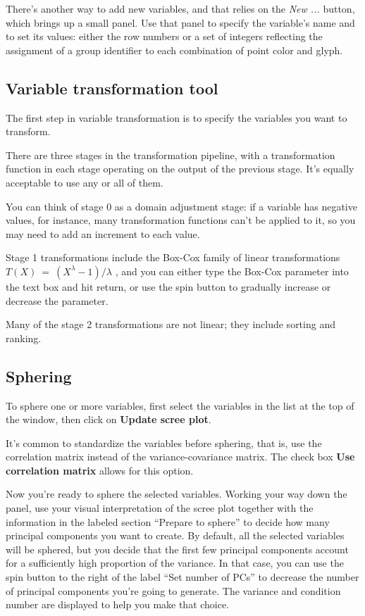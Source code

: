 \documentclass[11pt]{article}
\begin{document}
\label{NewVariable}
There's another way to add new variables, and that relies on the {\em New
...} button, which brings up a small panel.  Use that panel to specify
the variable's name and to set its values:  either the row numbers or
a set of integers reflecting the assignment of a group identifier to each
combination of point color and glyph.

\subsection{Variable transformation tool}
\label{slbl:VarTransform}

The first step in variable transformation is to specify the variables
you want to transform.

There are three stages in the transformation pipeline, with a
transformation function in each stage operating on the output of the
previous stage.  It's equally acceptable to use any or all of them.

You can think of stage 0 as a domain adjustment stage:  if a variable
has negative values, for instance, many transformation functions
can't be applied to it, so you may need to add an increment to each
value.

Stage 1 transformations include the Box-Cox family of linear
transformations \( T(X)~=~(X ^ \lambda - 1) / \lambda\) \cite{BoxCox64},
and you can either type the Box-Cox parameter into
the text box and hit return, or use the spin button to gradually
increase or decrease the parameter. 

Many of the stage 2
transformations are not linear; they include sorting and ranking.

\subsection{Sphering}
\label{slbl:Sphering}

To sphere one or more variables, first select the variables in the list
at the top of the window, then click on {\bf Update scree plot}.

It's common to standardize the variables before sphering, that is, use
the correlation matrix instead of the variance-covariance matrix. The
check box {\bf Use correlation matrix} allows for this option.

Now you're ready to sphere the selected variables.  Working your way down
the panel, use your visual interpretation of the scree plot together
with the information in the labeled section ``Prepare to sphere'' to
decide how many principal components you want to create.  By default,
all the selected variables will be sphered, but you decide that the first
few principal components account for a sufficiently high proportion of
the variance.  In that case, you can use the spin button to the right
of the label ``Set number of PCs'' to decrease the number of principal
components you're going to generate.  The variance and condition number
are displayed to help you make that choice.
\end{document}
